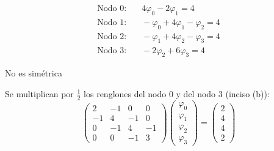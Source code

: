 \begin{align*}
	\text{Nodo 0:}&\quad 4\varphi_0 - 2\varphi_1 = 4\\
	\text{Nodo 1:}&\quad -\varphi_0 + 4\varphi_1 - \varphi_2 = 4\\
	\text{Nodo 2:}&\quad -\varphi_1 + 4\varphi_2 - \varphi_3 = 4\\
	\text{Nodo 3:}&\quad -2\varphi_2 + 6\varphi_3 = 4
\end{align*}

No es simétrica

Se multiplican por $\tfrac12$ los renglones del nodo $0$ y del nodo $3$ (inciso (b)):
\[
\begin{pmatrix} 2 & -1 & 0 & 0\\ -1 & 4 & -1 & 0\\ 0 & -1 & 4 & -1\\ 0 & 0 & -1 & 3 \end{pmatrix}
\begin{pmatrix} \varphi_0\\ \varphi_1\\ \varphi_2\\ \varphi_3 \end{pmatrix}
=
\begin{pmatrix} 2\\ 4\\ 4\\ 2 \end{pmatrix}
\]

